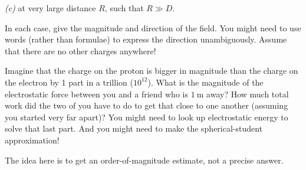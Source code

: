 \documentclass[12pt]{article}
\begin{document}
\textsl{(c)} at very large distance $R$, such that $R\gg D$.

In each case, give the magnitude and direction of the field. You might
need to use words (rather than formulae) to express the direction
unambiguously.
Assume that there are no other charges anywhere!

\startproblem%
Imagine that the charge on the proton is bigger in magnitude than the
charge on the electron by 1 part in a trillion ($10^{12}$).  What is
the magnitude of the electrostatic force between you and a friend who
is $1~\mathrm{m}$ away?  How much total work did the two of you have
to do to get that close to one another (assuming you started very far
apart)? You might need to look up electrostatic energy to solve that last part.
And you might need to make the spherical-student approximation!

The idea here is to get an order-of-magnitude estimate, not a precise answer.
\end{document}
